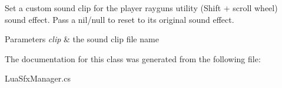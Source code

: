 Set a custom sound clip for the player raygun\textquotesingle{}s utility (Shift + scroll wheel) sound effect. Pass a nil/null to reset to its original sound effect. 


\begin{DoxyParams}{Parameters}
{\em clip} & the sound clip file name\\
\hline
\end{DoxyParams}


The documentation for this class was generated from the following file\+:\begin{DoxyCompactItemize}
\item 
Lua\+Sfx\+Manager.\+cs\end{DoxyCompactItemize}
